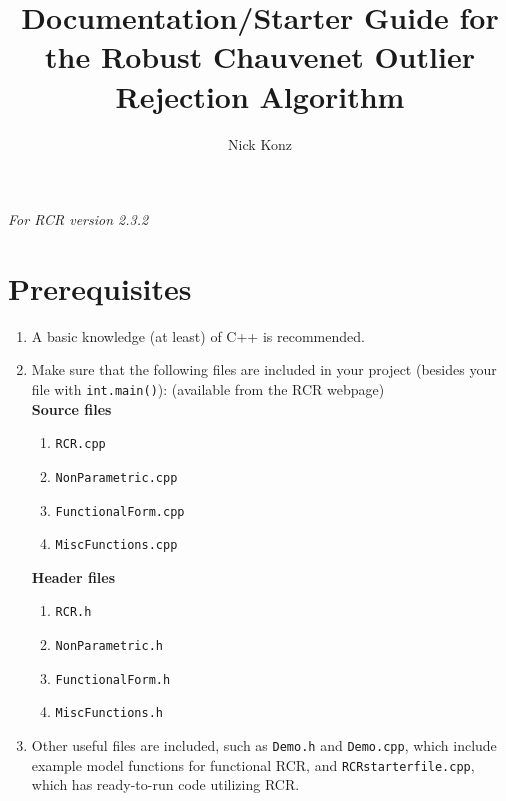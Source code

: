 \documentclass[12pt]{article}
\author{Nick Konz}
\title{Documentation/Starter Guide for the Robust Chauvenet Outlier Rejection Algorithm}
\begin{document}
	
\maketitle
\textit{For RCR version 2.3.2}
\section*{Prerequisites}
\begin{enumerate}
	\item A basic knowledge (at least) of C++ is recommended.
	\item Make sure that the following files are included in your project (besides your file with \texttt{int.main()}): (available from the RCR webpage)
	\\\textbf{Source files}
	\begin{enumerate}
		\item \texttt{RCR.cpp}
		\item \texttt{NonParametric.cpp}
		\item \texttt{FunctionalForm.cpp}
		\item \texttt{MiscFunctions.cpp}
	\end{enumerate}
	\textbf{Header files}
	\begin{enumerate}
		\item \texttt{RCR.h}
		\item \texttt{NonParametric.h}
		\item \texttt{FunctionalForm.h}
		\item \texttt{MiscFunctions.h}
	\end{enumerate}
	\item Other useful files are included, such as \texttt{Demo.h} and \texttt{Demo.cpp}, which include example model functions for functional RCR, and \texttt{RCRstarterfile.cpp}, which has ready-to-run code utilizing RCR.
\end{enumerate}
\end{document}
